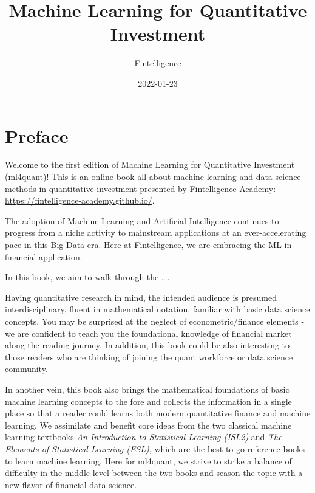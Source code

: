 \documentclass[
]{book}
\title{Machine Learning for Quantitative Investment}
\author{Fintelligence}
\date{2022-01-23}
\begin{document}
\maketitle

{
\setcounter{tocdepth}{1}
\tableofcontents
}
\hypertarget{preface}{%
\chapter*{Preface}\label{preface}}

Welcome to the first edition of {Machine Learning for Quantitative Investment (ml4quant)}! This is an online book all about machine learning and data science methods in quantitative investment presented by \href{https://fintelligence-academy.github.io/}{Fintelligence Academy}: \url{https://fintelligence-academy.github.io/}.

The adoption of Machine Learning and Artificial Intelligence continues to progress from a niche activity to mainstream applications at an ever-accelerating pace in this Big Data era. Here at Fintelligence, we are embracing the ML in financial application.

In this book, we aim to walk through the \ldots.

Having quantitative research in mind, the intended audience is presumed interdisciplinary, fluent in mathematical notation, familiar with basic data science concepts. You may be surprised at the neglect of econometric/finance elements - we are confident to teach you the foundational knowledge of financial market along the reading journey. In addition, this book could be also interesting to those readers who are thinking of joining the quant workforce or data science community.

In another vein, this book also brings the mathematical foundations of basic machine learning concepts to the fore and collects the information in a single place so that a reader could learns both modern quantitative finance and machine learning. We assimilate and benefit core ideas from the two classical machine learning textbooks \emph{\href{https://www.statlearning.com/}{An Introduction to Statistical Learning} (ISL2)} and \emph{\href{https://hastie.su.domains/Papers/ESLII.pdf}{The Elements of Statistical Learning} (ESL)}, which are the best to-go reference books to learn machine learning. Here for ml4quant, we strive to strike a balance of difficulty in the middle level between the two books and season the topic with a new flavor of financial data science.
\end{document}
